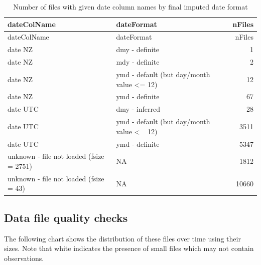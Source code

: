 \documentclass[]{article}
\begin{document}
\begin{longtable}[]{@{}llr@{}}
\caption{Number of files with given date column names by final imputed
date format}\tabularnewline
\toprule
dateColName & dateFormat & nFiles\tabularnewline
\midrule
\endfirsthead
\toprule
dateColName & dateFormat & nFiles\tabularnewline
\midrule
\endhead
date NZ & dmy - definite & 1\tabularnewline
date NZ & mdy - definite & 2\tabularnewline
date NZ & ymd - default (but day/month value \textless{}= 12) &
12\tabularnewline
date NZ & ymd - definite & 67\tabularnewline
date UTC & dmy - inferred & 28\tabularnewline
date UTC & ymd - default (but day/month value \textless{}= 12) &
3511\tabularnewline
date UTC & ymd - definite & 5347\tabularnewline
unknown - file not loaded (fsize = 2751) & NA & 1812\tabularnewline
unknown - file not loaded (fsize = 43) & NA & 10660\tabularnewline
\bottomrule
\end{longtable}

\subsection{Data file quality checks}\label{data-file-quality-checks}

The following chart shows the distribution of these files over time
using their sizes. Note that white indicates the presence of small files
which may not contain observations.
\end{document}
